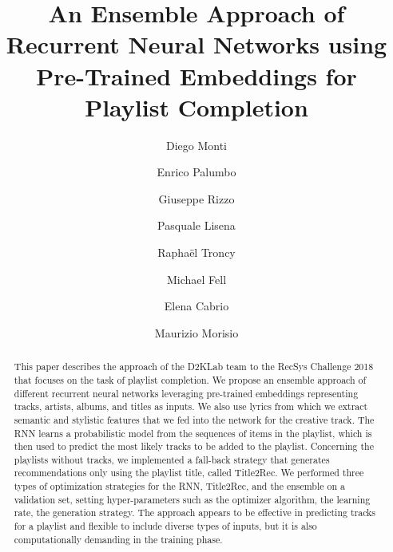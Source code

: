 \documentclass[sigconf]{acmart}
\begin{document}
\title{An Ensemble Approach of Recurrent Neural Networks using Pre-Trained Embeddings for Playlist Completion}


\author{Diego Monti}

\author{Enrico Palumbo}

\author{Giuseppe Rizzo}

\author{Pasquale Lisena}

\author{Rapha\"el Troncy}

\author{Michael Fell}

\author{Elena Cabrio}

\author{Maurizio Morisio}

\begin{abstract}
This paper describes the approach of the D2KLab team to the RecSys Challenge 2018 that focuses on the task of playlist completion. We propose an ensemble approach of different recurrent neural networks leveraging pre-trained embeddings representing tracks, artists, albums, and titles as inputs. We also use lyrics from which we extract semantic and stylistic features that we fed into the network for the creative track. The RNN learns a probabilistic model from the sequences of items in the playlist, which is then used to predict the most likely tracks to be added to the playlist. Concerning the playlists without tracks, we implemented a fall-back strategy that generates recommendations only using the playlist title, called Title2Rec. We performed three types of optimization strategies for the RNN, Title2Rec, and the ensemble on a validation set, setting hyper-parameters such as the optimizer algorithm, the learning rate, the generation strategy. The approach appears to be effective in predicting tracks for a playlist and flexible to include diverse types of inputs, but it is also computationally demanding in the training phase.
\end{abstract}
\end{document}
